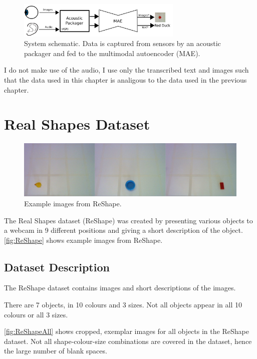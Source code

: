 \begin{figure}[h]
    \centering
    \includegraphics[width=0.7\textwidth]{Figs/chapter6/bimodal_system_schematic.png}
    \caption{System schematic. Data is captured from sensors by an acoustic packager and fed to the multimodal autoencoder (MAE).}
    \label{fig:schematic}
\end{figure}

I do not make use of the audio, I use only the transcribed text and images such that the data used in this chapter is analigous to the data used in the previous chapter.

\section{Real Shapes Dataset}

\begin{figure}[h]
    \centering
    \includegraphics[width=\textwidth]{Figs/chapter6/ReShapeExs.png}
    \caption{Example images from ReShape.}
    \label{fig:ReShape}
\end{figure}

The Real Shapes dataset (ReShape) was created by presenting various objects to a webcam in 9 different positions and giving a short description of the object. \autoref{fig:ReShape} shows example images from ReShape.

\subsection{Dataset Description}
The ReShape dataset contains images and short descriptions of the images.

There are 7 objects, in 10 colours and 3 sizes. Not all objects appear in all 10 colours or all 3 sizes.

\autoref{fig:ReShapeAll} shows cropped, exemplar images for all objects in the ReShape dataset. Not all shape-colour-size combinations are covered in the dataset, hence the large number of blank spaces.

